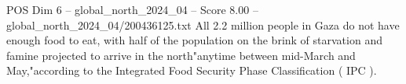 \begin{textsample}{POS Dim 6 – global\_north\_2024\_04 – Score 8.00 – global\_north\_2024\_04/200436125.txt}
All 2.2 million people in Gaza do not have enough food to eat, with half of the population on the brink of starvation and famine projected to arrive in the north"anytime between mid-March and May,"according to the Integrated Food Security Phase Classification ( IPC ).

\end{textsample}
